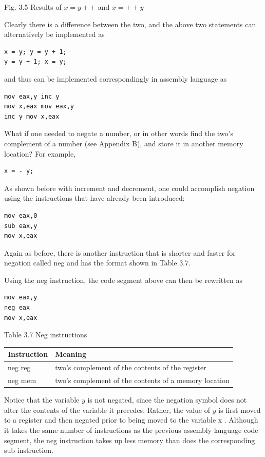 \documentclass[10pt]{article}
\begin{document}
Fig. 3.5 Results of $x=y++$ and $x=++y$

Clearly there is a difference between the two, and the above two statements can alternatively be implemented as

\begin{verbatim}
x = y; y = y + 1;
y = y + 1; x = y;
\end{verbatim}

and thus can be implemented correspondingly in assembly language as

\begin{verbatim}
mov eax,y inc y
mov x,eax mov eax,y
inc y mov x,eax
\end{verbatim}

What if one needed to negate a number, or in other words find the two's complement of a number (see Appendix B), and store it in another memory location? For example,

\begin{verbatim}
x = - y;
\end{verbatim}

As shown before with increment and decrement, one could accomplish negation using the instructions that have already been introduced:

\begin{verbatim}
mov eax,0
sub eax,y
mov x,eax
\end{verbatim}

Again as before, there is another instruction that is shorter and faster for negation called neg and has the format shown in Table 3.7.

Using the neg instruction, the code segment above can then be rewritten as

\begin{verbatim}
mov eax,y
neg eax
mov x,eax
\end{verbatim}

Table 3.7 Neg instructions

\begin{center}
\begin{tabular}{|l|l|}
\hline
Instruction & Meaning \\
\hline
neg reg & two's complement of the contents of the register \\
\hline
neg mem & two's complement of the contents of a memory location \\
\hline
\end{tabular}
\end{center}

Notice that the variable $y$ is not negated, since the negation symbol does not alter the contents of the variable it precedes. Rather, the value of $y$ is first moved to a register and then negated prior to being moved to the variable x . Although it takes the same number of instructions as the previous assembly language code segment, the neg instruction takes up less memory than does the corresponding sub instruction.
\end{document}
